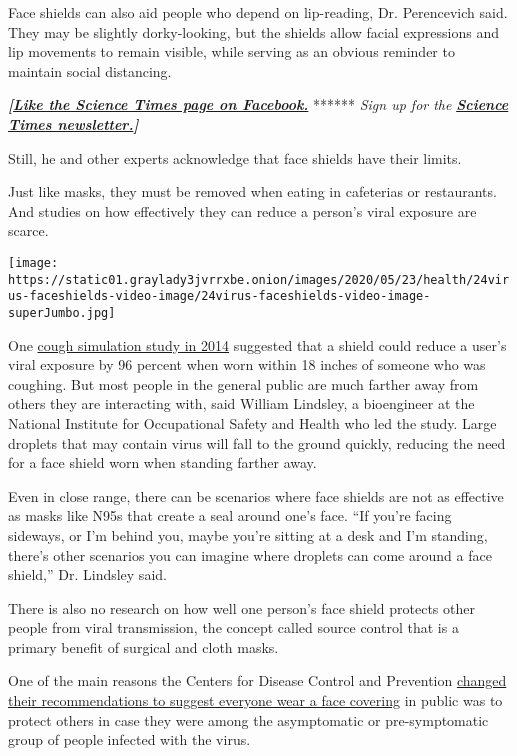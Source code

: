 Face shields can also aid people who depend on lip-reading, Dr.
Perencevich said. They may be slightly dorky-looking, but the shields
allow facial expressions and lip movements to remain visible, while
serving as an obvious reminder to maintain social distancing.

\textbf{\emph{{[}}\href{http://on.fb.me/1paTQ1h}{\emph{Like the Science
Times page on Facebook.}}} ****** \emph{\textbar{} Sign up for the}
\textbf{\href{http://nyti.ms/1MbHaRU}{\emph{Science Times
newsletter.}}\emph{{]}}}

Still, he and other experts acknowledge that face shields have their
limits.

Just like masks, they must be removed when eating in cafeterias or
restaurants. And studies on how effectively they can reduce a person's
viral exposure are scarce.

\texttt{[image: https://static01.graylady3jvrrxbe.onion/images/2020/05/23/health/24virus-faceshields-video-image/24virus-faceshields-video-image-superJumbo.jpg]}

One \href{https://www.ncbi.nlm.nih.gov/pubmed/24467190}{cough simulation
study in 2014} suggested that a shield could reduce a user's viral
exposure by 96 percent when worn within 18 inches of someone who was
coughing. But most people in the general public are much farther away
from others they are interacting with, said William Lindsley, a
bioengineer at the National Institute for Occupational Safety and Health
who led the study. Large droplets that may contain virus will fall to
the ground quickly, reducing the need for a face shield worn when
standing farther away.

Even in close range, there can be scenarios where face shields are not
as effective as masks like N95s that create a seal around one's face.
``If you're facing sideways, or I'm behind you, maybe you're sitting at
a desk and I'm standing, there's other scenarios you can imagine where
droplets can come around a face shield,'' Dr. Lindsley said.

There is also no research on how well one person's face shield protects
other people from viral transmission, the concept called source control
that is a primary benefit of surgical and cloth masks.

One of the main reasons the Centers for Disease Control and Prevention
\href{https://www.nytimes3xbfgragh.onion/2020/03/27/health/us-coronavirus-face-masks.html}{changed
their recommendations to suggest everyone wear a face covering} in
public was to protect others in case they were among the asymptomatic or
pre-symptomatic group of people infected with the virus.

